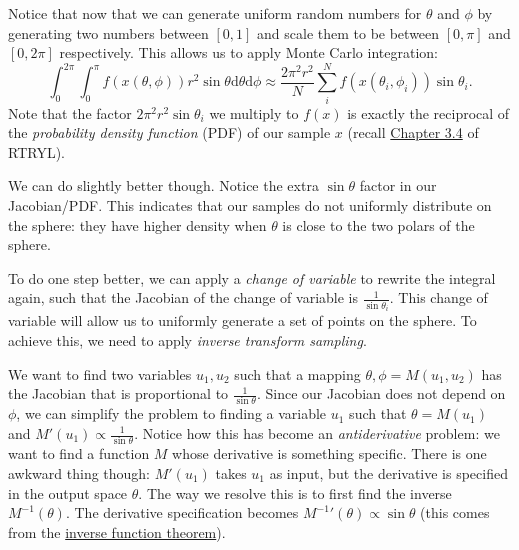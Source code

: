 Notice that now that we can generate uniform random numbers for $\theta$ and $\phi$ by generating two numbers between $[0, 1]$ and scale them to be between $[0, \pi]$ and $[0, 2\pi]$ respectively. This allows us to apply Monte Carlo integration:
\begin{equation}
    \int_{0}^{2\pi}\int_{0}^{\pi} f(x(\theta, \phi)) r^2 \sin\theta \mathrm{d}\theta \mathrm{d} \phi
    \approx \frac{2\pi^2 r^2}{N} \sum_i^N f(x(\theta_i, \phi_i))\sin\theta_i.
    \label{eq:naive_monte_carlo_sphere}
\end{equation}
Note that the factor $2\pi^2 r^2 \sin\theta_i$ we multiply to $f(x)$ is exactly the reciprocal of the \emph{probability density function} (PDF) of our sample $x$ (recall \href{https://raytracing.github.io/books/RayTracingTheRestOfYourLife.html#onedimensionalmcintegration/importancesampling}{Chapter 3.4} of RTRYL). 

We can do slightly better though. Notice the extra $\sin\theta$ factor in our Jacobian/PDF. This indicates that our samples do not uniformly distribute on the sphere: they have higher density when $\theta$ is close to the two polars of the sphere.

To do one step better, we can apply a \emph{change of variable} to rewrite the integral again, such that the Jacobian of the change of variable is $\frac{1}{\sin\theta_i}$. This change of variable will allow us to uniformly generate a set of points on the sphere. To achieve this, we need to apply \emph{inverse transform sampling}. 

We want to find two variables $u_1, u_2$ such that a mapping $\theta, \phi = M(u_1, u_2)$ has the Jacobian that is proportional to $\frac{1}{\sin\theta}$. Since our Jacobian does not depend on $\phi$, we can simplify the problem to finding a variable $u_1$ such that $\theta = M(u_1)$ and $M'(u_1) \propto \frac{1}{\sin\theta}$. Notice how this has become an \emph{antiderivative} problem: we want to find a function $M$ whose derivative is something specific. There is one awkward thing though: $M'(u_1)$ takes $u_1$ as input, but the derivative is specified in the output space $\theta$. The way we resolve this is to first find the inverse $M^{-1}(\theta)$. The derivative specification becomes ${M^{-1}}'(\theta) \propto \sin\theta$ (this comes from the \href{https://en.wikipedia.org/wiki/Inverse_function_theorem}{inverse function theorem}). 

